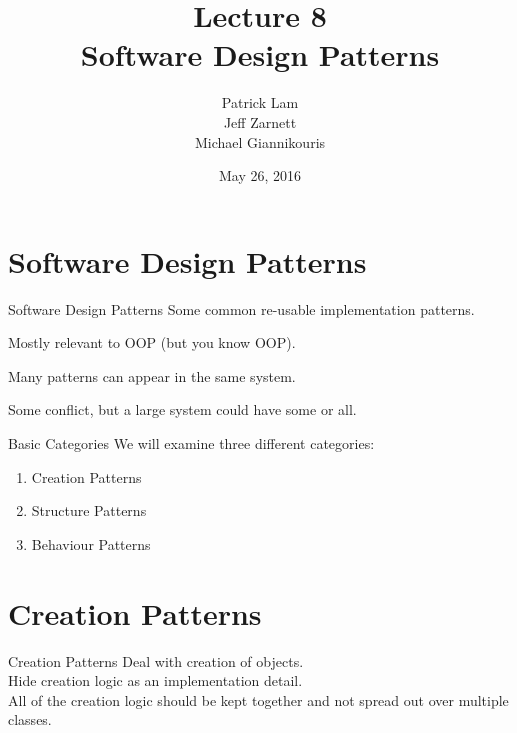 \documentclass[14pt,aspectratio=169]{beamer}
\title{Lecture 8 \\ Software Design Patterns}
\date{May 26, 2016}
\author{Patrick Lam \\ Jeff Zarnett \\ Michael Giannikouris}
\institute{Department of Electrical and Computer Engineering}
\begin{document}
\maketitle



\section*{Software Design Patterns}


% 
\begin{frame}{Software Design Patterns}
Some common re-usable implementation patterns.

Mostly relevant to OOP (but you know OOP).

Many patterns can appear in the same system.

Some conflict, but a large system could have some or all.
\end{frame}



% 
\begin{frame}{Basic Categories}
We will examine three different categories:

\begin{enumerate}
	\item Creation Patterns
	\item Structure Patterns
	\item Behaviour Patterns
\end{enumerate}
\end{frame}



\section*{Creation Patterns}



% 
\begin{frame}{Creation Patterns}
Deal with creation of objects. \\
\vspace{1em}
Hide creation logic as an implementation detail. \\
\vspace{1em}
All of the creation logic should be kept together and not spread out over multiple classes.
\end{frame}
\end{document}
